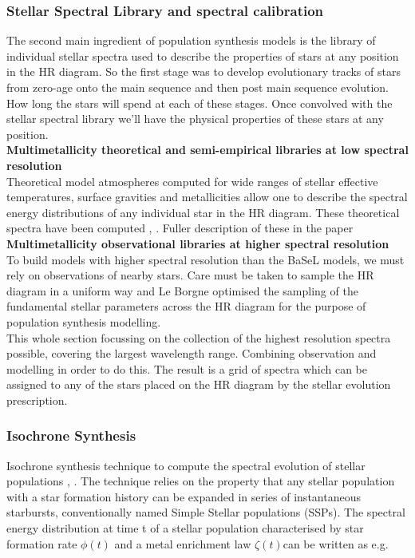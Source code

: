 \documentclass{literature}
\begin{document}
\subsubsection{Stellar Spectral Library and spectral calibration}
The second main ingredient of population synthesis models is the library of individual stellar spectra used to describe the properties of stars at any position in the HR diagram. So the first stage was to develop evolutionary tracks of stars from zero-age onto the main sequence and then post main sequence evolution. How long the stars will spend at each of these stages. Once convolved with the stellar spectral library we'll have the physical properties of these stars at any position. \\

\textbf{Multimetallicity theoretical and semi-empirical libraries at low spectral resolution} \\ 
Theoretical model atmospheres computed for wide ranges of stellar effective temperatures, surface gravities and metallicities allow one to describe the spectral energy distributions of any individual star in the HR diagram. These theoretical spectra have been computed \citep{Lejeune_1997}, \citep{Lejeune_1998}. Fuller description of these in the paper   \\ 

\textbf{Multimetallicity observational libraries at higher spectral resolution} \\
To build models with higher spectral resolution than the BaSeL models, we must rely on observations of nearby stars. Care must be taken to sample the HR diagram in a uniform way and Le Borgne \citep{Borgne_2003} optimised the sampling of the fundamental stellar parameters across the HR diagram for the purpose of population synthesis modelling. \\ 

This whole section focussing on the collection of the highest resolution spectra possible, covering the largest wavelength range. Combining observation and modelling in order to do this. The result is a grid of spectra which can be assigned to any of the stars placed on the HR diagram by the stellar evolution prescription. 

\subsubsection{Isochrone Synthesis}
Isochrone synthesis technique to compute the spectral evolution of stellar populations \citep{Bruzual_1991}, \citep{Bruzual_1993}. The technique relies on the property that any stellar population with a star formation history can be expanded in series of instantaneous starbursts, conventionally named Simple Stellar populations (SSPs). The spectral energy distribution at time t of a stellar population characterised by star formation rate $\phi (t)$ and a metal enrichment law $\zeta (t) $can be written as e.g.
\end{document}
